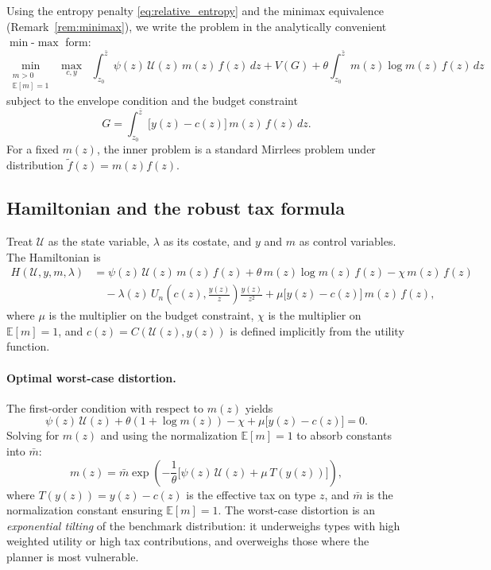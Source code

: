 \documentclass[12pt,a4paper]{article}
\theoremstyle{definition}
\theoremstyle{plain}
\theoremstyle{remark}
\newcommand{\E}{\mathbb{E}}
\newcommand{\zbar}{\bar{z}}
\newcommand{\zlow}{z_{\scriptscriptstyle 0}}
\newcommand{\calU}{\mathcal{U}}
\begin{document}
Using the entropy penalty \eqref{eq:relative_entropy} and the minimax equivalence (Remark~\ref{rem:minimax}), we write the problem in the analytically convenient $\min$-$\max$ form:
\begin{equation}
\label{eq:robust_mirrlees}
  \min_{\substack{m > 0 \\ \E[m] = 1}} \; \max_{c,y} \;\;
  \int_{\zlow}^{\zbar} \psi(z)\, \calU(z)\, m(z)\, f(z)\, dz
  + V(G) + \theta \int_{\zlow}^{\zbar} m(z) \log m(z)\, f(z)\, dz
\end{equation}
subject to the envelope condition and the budget constraint
\[
  G = \int_{\zlow}^{\zbar} \bigl[y(z) - c(z)\bigr]\, m(z)\, f(z)\, dz.
\]
For a fixed $m(z)$, the inner problem is a standard Mirrlees problem under distribution $\widetilde{f}(z) = m(z) f(z)$.

\subsection{Hamiltonian and the robust tax formula}
\label{sec:robust_hamiltonian}

Treat $\calU$ as the state variable, $\lambda$ as its costate, and $y$ and $m$ as control variables. The Hamiltonian is
\begin{equation}
\label{eq:robust_H}
\begin{split}
  H(\calU, y, m, \lambda) &= \psi(z)\, \calU(z)\, m(z)\, f(z)
    + \theta\, m(z) \log m(z)\, f(z) - \chi\, m(z)\, f(z) \\
  &\quad - \lambda(z)\, U_n\!\left(c(z), \frac{y(z)}{z}\right) \frac{y(z)}{z^2}
    + \mu\bigl[y(z) - c(z)\bigr]\, m(z)\, f(z),
\end{split}
\end{equation}
where $\mu$ is the multiplier on the budget constraint, $\chi$ is the multiplier on $\E[m] = 1$, and $c(z) = C(\calU(z), y(z))$ is defined implicitly from the utility function.

\paragraph{Optimal worst-case distortion.}
The first-order condition with respect to $m(z)$ yields
\[
  \psi(z)\, \calU(z) + \theta(1 + \log m(z)) - \chi + \mu\bigl[y(z) - c(z)\bigr] = 0.
\]
Solving for $m(z)$ and using the normalization $\E[m] = 1$ to absorb constants into $\bar{m}$:
\begin{equation}
\label{eq:robust_m}
  m(z) = \bar{m} \exp\!\left(-\frac{1}{\theta}\bigl[\psi(z)\, \calU(z) + \mu\, T(y(z))\bigr]\right),
\end{equation}
where $T(y(z)) = y(z) - c(z)$ is the effective tax on type $z$, and $\bar{m}$ is the normalization constant ensuring $\E[m] = 1$. The worst-case distortion is an \emph{exponential tilting} of the benchmark distribution: it underweighs types with high weighted utility or high tax contributions, and overweighs those where the planner is most vulnerable.
\end{document}
